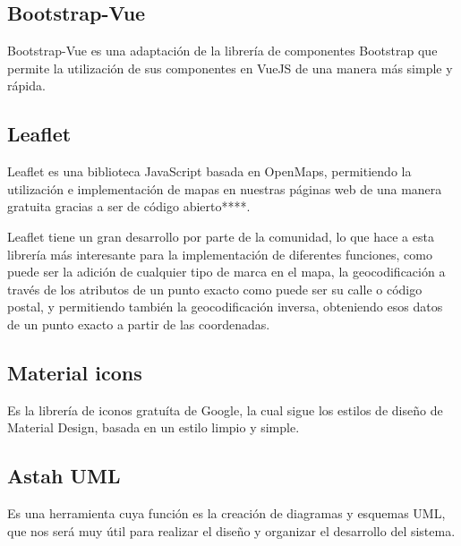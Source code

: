     \subsection{Bootstrap-Vue}

Bootstrap-Vue es una adaptación de la librería de componentes Bootstrap que permite la utilización de sus componentes en VueJS de una manera más simple y rápida.

    \subsection{Leaflet}

Leaflet es una biblioteca JavaScript basada en OpenMaps, permitiendo la utilización e implementación de mapas en nuestras páginas web de una manera gratuita gracias a ser de código abierto****.

Leaflet tiene un gran desarrollo por parte de la comunidad, lo que hace a esta librería más interesante para la implementación de diferentes funciones, como puede ser la adición de cualquier tipo de marca en el mapa, la geocodificación a través de los atributos de un punto exacto como puede ser su calle o código postal, y permitiendo también la geocodificación inversa, obteniendo esos datos de un punto exacto a partir de las coordenadas.

    \subsection{Material icons}

Es la librería de iconos gratuíta de Google, la cual sigue los estilos de diseño de Material Design, basada en un estilo limpio y simple.

    \subsection{Astah UML}
Es una herramienta cuya función es la creación de diagramas y esquemas UML, que nos será muy útil para realizar el diseño y organizar el desarrollo del sistema.
